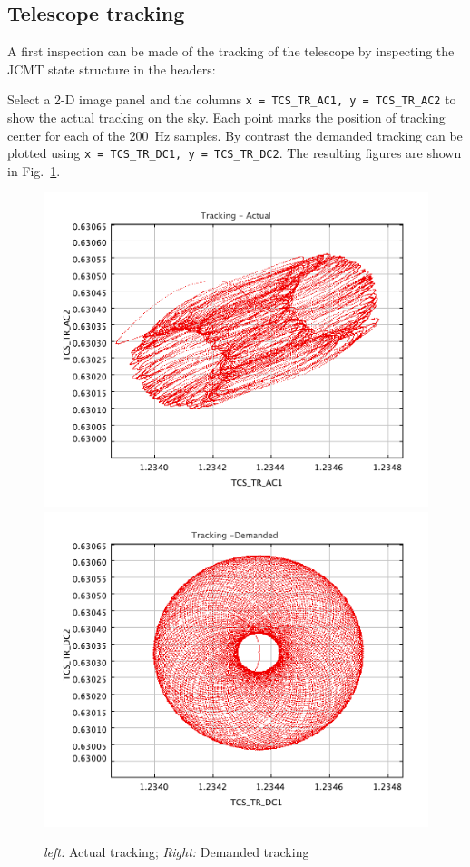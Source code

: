 \documentclass[twoside,11pt]{starlink}
\begin{document}
\subsection{Telescope tracking}
\label{sec:tracking}

A first inspection can be made of the tracking of the telescope by
inspecting the JCMT state structure in the headers:

\begin{terminalv}
\end{terminalv}

Select a 2-D image panel and the columns \texttt{x = TCS\_TR\_AC1, y =
TCS\_TR\_AC2} to show the actual tracking on the sky.  Each point
marks the position of tracking center for each of the 200~Hz samples.
By contrast the demanded tracking can be plotted using
\texttt{x~=~TCS\_TR\_DC1, y~=~TCS\_TR\_DC2}. The resulting figures are
shown in Fig.~\ref{fig:tracking}.

\begin{figure}[ht]
\begin{center}
\includegraphics[width=0.45\linewidth]{sc19_tracking_actual}
\hspace{0.03\linewidth}
\includegraphics[width=0.45\linewidth]{sc19_tracking_demand}
\caption{\textsl{left:} Actual tracking; \textsl{Right:} Demanded tracking }
\label{fig:tracking}
\end{center}
\end{figure}
\end{document}
